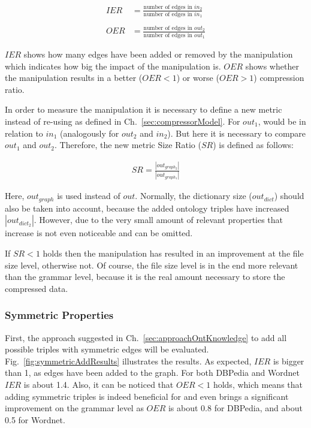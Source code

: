 \begin{align*}
IER&=\frac {\text{number of edges in } in_2} {\text{number of edges in  } in_1}
\\\\
OER&=\frac {\text{number of edges in } out_2} {\text{number of edges in } out_1}
 \end{align*}
 
$IER$ shows how many edges have been added or removed by the manipulation which indicates how big the impact of the manipulation is. $OER$  shows whether the manipulation results in a better ($OER<1$) or worse ($OER>1$) compression ratio.

In order to measure the manipulation it is necessary to define a new metric instead of re-using  as defined in Ch.~\ref{sec:compressorModel}. For $out_1$,  would be in relation to $in_1$ (analogously for $out_2$ and $in_2$). But here it is necessary to compare $out_1$ and $out_2$. Therefore, the new metric Size Ratio ($SR$) is defined as follows:

\begin{align*} 
SR=\frac {|out_{graph_2}|} {|out_{graph_1}|}
\end{align*}

Here, $out_{graph}$ is used instead of $out$. Normally, the dictionary size ($out_{dict}$) should also be taken into account, because the added ontology triples have increased $|out_{dict_2}|$. However, due to the very small amount of relevant properties that increase is not even noticeable and can be omitted. 

If $SR<1$ holds then the manipulation has resulted in an improvement at the file size level, otherwise not. Of course, the file size level is in the end more relevant than the grammar level, because it is the real amount necessary to store the compressed data.



\subsubsection{Symmetric Properties}

First, the approach suggested in Ch.~\ref{sec:approachOntKnowledge} to add all possible triples with symmetric edges will be evaluated. Fig.~\ref{fig:symmetricAddResults} illustrates the results. As expected, $IER$ is bigger than 1, as edges have been added to the graph. For both DBPedia and Wordnet $IER$ is about 1.4. Also, it can be noticed that $OER<1$ holds, which means that adding symmetric triples is indeed beneficial for \GGRP{} and even brings a significant improvement on the grammar level as $OER$ is about 0.8 for DBPedia, and about 0.5 for Wordnet.

